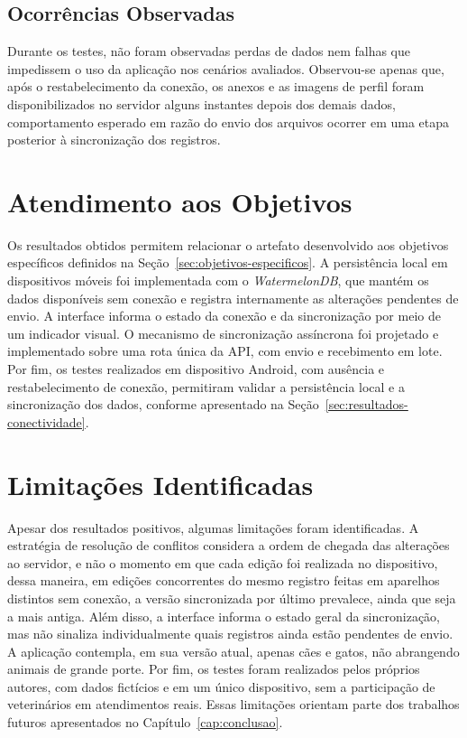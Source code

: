 \subsection{Ocorrências Observadas}

Durante os testes, não foram observadas perdas de dados nem falhas que impedissem o uso da aplicação nos cenários avaliados. Observou-se apenas que, após o restabelecimento da conexão, os anexos e as imagens de perfil foram disponibilizados no servidor alguns instantes depois dos demais dados, comportamento esperado em razão do envio dos arquivos ocorrer em uma etapa posterior à sincronização dos registros.

\section{Atendimento aos Objetivos}
\label{sec:resultados-objetivos}

Os resultados obtidos permitem relacionar o artefato desenvolvido aos objetivos específicos definidos na Seção~\ref{sec:objetivos-especificos}. A persistência local em dispositivos móveis foi implementada com o \textit{WatermelonDB}, que mantém os dados disponíveis sem conexão e registra internamente as alterações pendentes de envio. A interface informa o estado da conexão e da sincronização por meio de um indicador visual. O mecanismo de sincronização assíncrona foi projetado e implementado sobre uma rota única da API, com envio e recebimento em lote. Por fim, os testes realizados em dispositivo Android, com ausência e restabelecimento de conexão, permitiram validar a persistência local e a sincronização dos dados, conforme apresentado na Seção~\ref{sec:resultados-conectividade}.

\section{Limitações Identificadas}
\label{sec:resultados-limitacoes}

Apesar dos resultados positivos, algumas limitações foram identificadas. A estratégia de resolução de conflitos considera a ordem de chegada das alterações ao servidor, e não o momento em que cada edição foi realizada no dispositivo, dessa maneira, em edições concorrentes do mesmo registro feitas em aparelhos distintos sem conexão, a versão sincronizada por último prevalece, ainda que seja a mais antiga. Além disso, a interface informa o estado geral da sincronização, mas não sinaliza individualmente quais registros ainda estão pendentes de envio. A aplicação contempla, em sua versão atual, apenas cães e gatos, não abrangendo animais de grande porte. Por fim, os testes foram realizados pelos próprios autores, com dados fictícios e em um único dispositivo, sem a participação de veterinários em atendimentos reais. Essas limitações orientam parte dos trabalhos futuros apresentados no Capítulo~\ref{cap:conclusao}.
